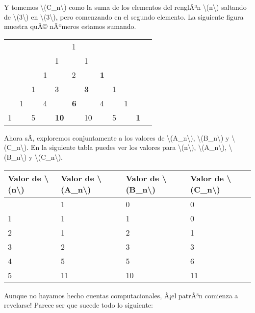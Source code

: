 \documentclass[
]{article}
\begin{document}
Y tomemos {\textbackslash(C\_n\textbackslash)} como la suma de los
elementos del renglÃ³n {\textbackslash(n\textbackslash)} saltando de
{\textbackslash(3\textbackslash)} en {\textbackslash(3\textbackslash)},
pero comenzando en el segundo elemento. La siguiente figura muestra quÃ©
nÃºmeros estamos sumando.

\begin{longtable}[]{@{}llllllllllll@{}}
\toprule\noalign{}
& & & & & & & & & & & \\
\midrule\noalign{}
\endhead
\bottomrule\noalign{}
\endlastfoot
& & & & & 1 & & & & & & \\
& & & & 1 & & 1 & & & & & \\
& & & 1 & & 2 & & \textbf{1} & & & & \\
& & 1 & & 3 & & \textbf{3} & & 1 & & & \\
& 1 & & 4 & & \textbf{6} & & 4 & & 1 & & \\
1 & & 5 & & \textbf{10} & & 10 & & 5 & & \textbf{1} & \\
\end{longtable}

Ahora sÃ­, exploremos conjuntamente a los valores de
{\textbackslash(A\_n\textbackslash)},
{\textbackslash(B\_n\textbackslash)} y
{\textbackslash(C\_n\textbackslash)}. En la siguiente tabla puedes ver
los valores para {\textbackslash(n\textbackslash)},
{\textbackslash(A\_n\textbackslash)},
{\textbackslash(B\_n\textbackslash)} y
{\textbackslash(C\_n\textbackslash)}.

\begin{longtable}[]{@{}llll@{}}
\toprule\noalign{}
Valor de {\textbackslash(n\textbackslash)} & Valor de
{\textbackslash(A\_n\textbackslash)} & Valor de
{\textbackslash(B\_n\textbackslash)} & Valor de
{\textbackslash(C\_n\textbackslash)} \\
\midrule\noalign{}
\endhead
\bottomrule\noalign{}
\endlastfoot
0 & 1 & 0 & 0 \\
1 & 1 & 1 & 0 \\
2 & 1 & 2 & 1 \\
3 & 2 & 3 & 3 \\
4 & 5 & 5 & 6 \\
5 & 11 & 10 & 11 \\
\end{longtable}

Aunque no hayamos hecho cuentas computacionales, Â¡el patrÃ³n comienza a
revelarse! Parece ser que sucede todo lo siguiente:
\end{document}

